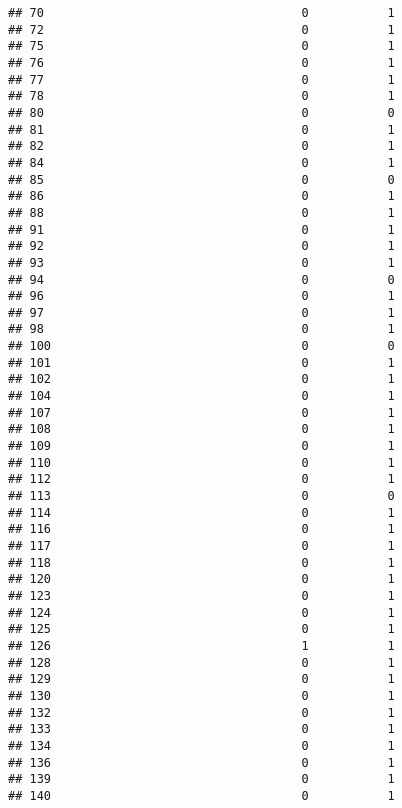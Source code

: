 \documentclass[
]{article}
\begin{document}
\begin{verbatim}
## 70                                    0           1
## 72                                    0           1
## 75                                    0           1
## 76                                    0           1
## 77                                    0           1
## 78                                    0           1
## 80                                    0           0
## 81                                    0           1
## 82                                    0           1
## 84                                    0           1
## 85                                    0           0
## 86                                    0           1
## 88                                    0           1
## 91                                    0           1
## 92                                    0           1
## 93                                    0           1
## 94                                    0           0
## 96                                    0           1
## 97                                    0           1
## 98                                    0           1
## 100                                   0           0
## 101                                   0           1
## 102                                   0           1
## 104                                   0           1
## 107                                   0           1
## 108                                   0           1
## 109                                   0           1
## 110                                   0           1
## 112                                   0           1
## 113                                   0           0
## 114                                   0           1
## 116                                   0           1
## 117                                   0           1
## 118                                   0           1
## 120                                   0           1
## 123                                   0           1
## 124                                   0           1
## 125                                   0           1
## 126                                   1           1
## 128                                   0           1
## 129                                   0           1
## 130                                   0           1
## 132                                   0           1
## 133                                   0           1
## 134                                   0           1
## 136                                   0           1
## 139                                   0           1
## 140                                   0           1

\end{verbatim}
\end{document}
